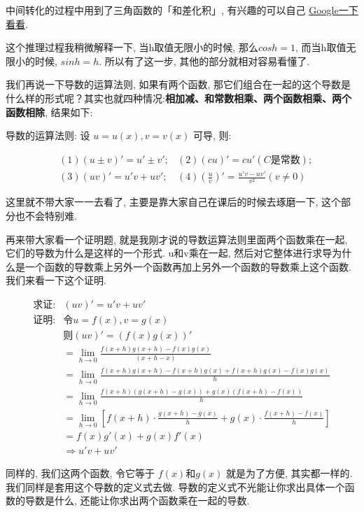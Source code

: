 中间转化的过程中用到了三角函数的「和差化积」, 有兴趣的可以自己 \href{https://www.google.com/search?q=%E5%92%8C%E5%B7%AE%E5%8C%96%E7%A7%AF&sourceid=chrome&ie=UTF-8}{Google一下看看}. 

这个推理过程我稍微解释一下, 当h取值无限小的时候, 那么$cosh=1$,  而当h取值无限小的时候, $sinh=h$. 所以有了这一步, 其他的部分就相对容易看懂了. 

我们再说一下导数的运算法则, 如果有两个函数, 那它们组合在一起的这个导数是什么样的形式呢？其实也就四种情况:\textbf{相加减、和常数相乘、两个函数相乘、两个函数相除}, 结果如下: 

导数的运算法则: 设 $u=u(x), v=v(x)$ 可导, 则:

\begin{align*}
  & (1) (u\pm v)'=u'\pm v'; &(2) (cu)'=cu' (C\mbox{是常数}); \\
  & (3) (uv)'=u'v+uv'; &(4) (\frac{u}{v})'=\frac{u'v-uv'}{v^2}(v \ne 0)
\end{align*}

这里就不带大家一一去看了, 主要是靠大家自己在课后的时候去琢磨一下, 这个部分也不会特别难. 

再来带大家看一个证明题, 就是我刚才说的导数运算法则里面两个函数乘在一起, 它们的导数为什么是这样的一个形式. u和v乘在一起, 然后对它整体进行求导为什么是一个函数的导数乘上另外一个函数再加上另外一个函数的导数乘上这个函数. 我们来看一下这个证明. 


\begin{align*}
  \mbox{求证:} &  (uv)'=u'v + uv' \\
  \mbox{证明:} & \mbox{令} u = f(x), v = g(x) \\
  & \mbox{则} (uv)' = (f(x)g(x))' \\ 
  & = \lim_{h\to 0}\frac{f(x+h)g(x+h) - f(x)g(x)}{(x+h - x)} \\
  & =\lim_{h\to0}\frac{f(x+h)g(x+h)-f(x+h)g(x)+f(x+h)g(x)-f(x)g(x)}{h} \\
  & =\lim_{h\to0}\frac{f(x+h)(g(x+h)-g(x)) +g(x)(f(x+h)-f(x))}{h} \\
  & =\lim_{h\to0}\left[f(x+h) \cdot \frac{g(x+h)-g(x)}{h} + g(x)\cdot \frac{f(x+h)-f(x)}{h} \right] \\
  & =f(x)g'(x) + g(x)f'(x) \\
  & \Rightarrow u'v + uv'
\end{align*}


同样的, 我们这两个函数, 令它等于 $f(x)$和$g(x)$ 就是为了方便, 其实都一样的. 我们同样是套用这个导数的定义式去做. 导数的定义式不光能让你求出具体一个函数的导数是什么, 还能让你求出两个函数乘在一起的导数. 

